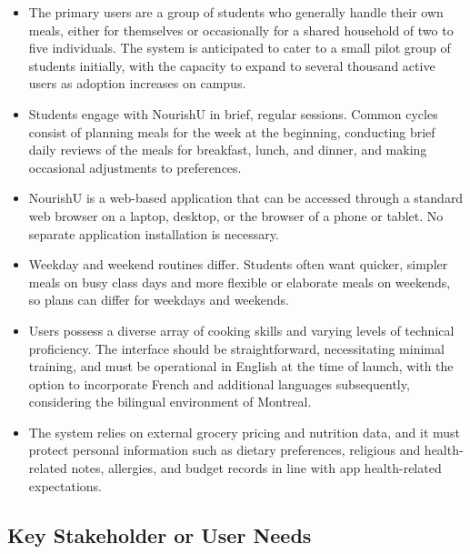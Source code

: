 \documentclass[11pt,a4paper]{article}
\begin{document}
\begin{itemize}[leftmargin=1.5em, itemsep=3pt]
    \item The primary users are a group of students who generally handle their own meals, either for themselves or occasionally for a shared household of two to five individuals. The system is anticipated to cater to a small pilot group of students initially, with the capacity to expand to several thousand active users as adoption increases on campus.
    \item Students engage with NourishU in brief, regular sessions. Common cycles consist of planning meals for the week at the beginning, conducting brief daily reviews of the meals for breakfast, lunch, and dinner, and making occasional adjustments to preferences.
    \item NourishU is a web-based application that can be accessed through a standard web browser on a laptop, desktop, or the browser of a phone or tablet. No separate application installation is necessary.
    \item Weekday and weekend routines differ. Students often want quicker, simpler meals on busy class days and more flexible or elaborate meals on weekends, so plans can differ for weekdays and weekends.
    \item Users possess a diverse array of cooking skills and varying levels of technical proficiency. The interface should be straightforward, necessitating minimal training, and must be operational in English at the time of launch, with the option to incorporate French and additional languages subsequently, considering the bilingual environment of Montreal.
    \item The system relies on external grocery pricing and nutrition data, and it must protect personal information such as dietary preferences, religious and health-related notes, allergies, and budget records in line with app health-related expectations.
\end{itemize}

\subsection{Key Stakeholder or User Needs}
\end{document}
